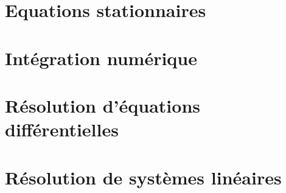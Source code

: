 \def\xxactivite{Cours}
\def\xxauteur{\textsl{Xavier Pessoles}}

\fichefalse
\proftrue
\tdfalse
\courstrue

\def\xxnumchapitre{Chapitre 1 \vspace{.2cm}}
\def\xxchapitre{\hspace{.12cm} Détermination des liaisons équivalentes}

\def\xxcompetences{%
\textsl{%
\textbf{Savoirs et compétences :}\\
\begin{itemize}[label=\ding{112},font=\color{ocre}] 
\item B2-12 : proposer un modèle cinématique à partir d'un système réel ou d'une maquette numérique;
\item B2-15 : Simplifier un modèle de mécanisme.
\end{itemize}
}}


\def\xxfigures{
\texttt{[image: lola]}\\
\textit{Robot humanoïde Lola}

\vspace{.5cm}

\texttt{[image: simu]}\\
\textit{Simulateur de vol Lockheed Martin}
}%


\vspace{2cm}
\pagestyle{fancy}
\thispagestyle{plain}


\section{Equations stationnaires}

\section{Intégration numérique}

\section{Résolution d'équations différentielles}

\section{Résolution de systèmes linéaires}
